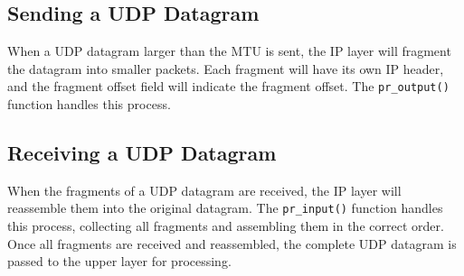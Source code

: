 \subsection{Sending a UDP Datagram}

When a UDP datagram larger than the MTU is sent, the IP layer will fragment the datagram into smaller packets. Each fragment will have its own IP header, and the fragment offset field will indicate the fragment offset. The \texttt{pr\_output()} function handles this process.

\subsection{Receiving a UDP Datagram}

When the fragments of a UDP datagram are received, the IP layer will reassemble them into the original datagram. The \texttt{pr\_input()} function handles this process, collecting all fragments and assembling them in the correct order. Once all fragments are received and reassembled, the complete UDP datagram is passed to the upper layer for processing.
